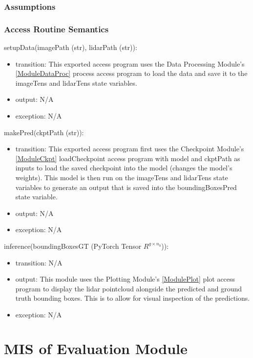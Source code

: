 \documentclass[12pt, titlepage]{article}
\begin{document}
\subsubsection{Assumptions}



\subsubsection{Access Routine Semantics}
\noindent setupData(imagePath (str), lidarPath (str)):
\begin{itemize}
\item transition: This exported access program uses the Data Processing Module's \ref{ModuleDataProc} process access program to load the data and save it to the imageTens and lidarTens state variables.
\item output: N/A
\item exception: N/A
\end{itemize}

\noindent makePred(ckptPath (str)):
\begin{itemize}
\item transition: This exported access program first uses the Checkpoint Module's \ref{ModuleCkpt} loadCheckpoint access program with model and ckptPath as inputs to load the saved checkpoint into the model (changes the model's weights). This model is then run on the imageTens and lidarTens state variables to generate an output that is saved into the boundingBoxesPred state variable.
\item output: N/A
\item exception: N/A
\end{itemize}

\noindent inference(boundingBoxesGT (PyTorch Tensor $R^{g\times{}n_{b}}$)):
\begin{itemize}
\item transition: N/A 
\item output: This module uses the Plotting Module's \ref{ModulePlot} plot access program to display the lidar pointcloud alongside the predicted and ground truth bounding boxes. This is to allow for visual inspection of the predictions.
\item exception: N/A
\end{itemize}

\newpage

\section{MIS of Evaluation Module} \label{ModuleEval} 
\end{document}
